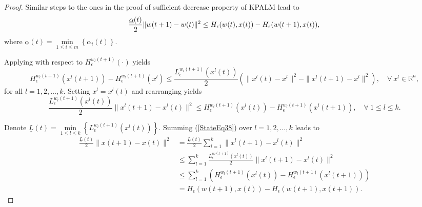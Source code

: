 \documentclass[11pt]{article}
\numberwithin{equation}{section}
\begin{document}
\begin{proof}
Similar steps to the ones in the proof of sufficient decrease property of KPALM lead to
\begin{equation}
	\frac{\underline{\alpha}(t)}{2} \|w(t+1) - w(t)\|^2 \leq H_{\epsilon}(w(t),x(t)) - H_{\epsilon}(w(t+1),x(t)) , \\ \label{StateEq37}
\end{equation}
where $\underline{\alpha}(t) = \min\limits_{1 \leq i \leq m} \left\lbrace \alpha_i(t) \right\rbrace$.

Applying  with respect to $H_{\epsilon}^{w_l(t+1)}(\cdot)$ yields
\begin{equation*}
	H_{\epsilon}^{w_l(t+1)}(x^l(t+1)) - H_{\epsilon}^{w_l(t+1)}(x^l) 
	\leq \frac{L_{\epsilon}^{w_l(t+1)}(x^l(t))}{2} \left( \|x^l(t) - x^l\|^2 - \|x^l(t+1) - x^l\|^2 \right), \quad \forall \: x^l \in \mathbb{R}^n,
\end{equation*}
for all $l=1,2, \ldots, k$.
Setting $x^l = x^l(t)$ and rearranging yields
\begin{equation}
	\frac{L_{\epsilon}^{w_l(t+1)}(x^l(t))}{2} \|x^l(t+1) - x^l(t)\|^2 \leq H_{\epsilon}^{w_l(t+1)}(x^l(t)) - H_{\epsilon}^{w_l(t+1)}(x^l(t+1)), \quad \forall \: 1 \leq l \leq k . \label{StateEq38}
\end{equation}

Denote ${\underline{L}(t)}= \min\limits_{1 \leq l \leq k} \left\lbrace L_{\epsilon}^{w_l(t+1)}(x^l(t)) \right\rbrace$. Summing (\ref{StateEq38}) over $l = 1,2, \ldots ,k$ leads to
\begin{equation}
	\begin{split}
	\frac{\underline{L}(t)}{2} \|x(t+1) - x(t)\|^2 &= 
	\frac{\underline{L}(t)}{2} \sum\limits_{l=1}^{k} \|x^l(t+1) - x^l(t)\|^2 \\
	& \leq \sum\limits_{l=1}^{k} \frac{L_{\epsilon}^{w_l(t+1)}(x^l(t))}{2} \|x^l(t+1) - x^l(t)\|^2 \\
	& \leq \sum\limits_{l=1}^{k} \left( H_{\epsilon}^{w_l(t+1)}(x^l(t)) - H_{\epsilon}^{w_l(t+1)}(x^l(t+1)) \right) \\
	& = H_{\epsilon}(w(t+1),x(t)) - H_{\epsilon}(w(t+1),x(t+1)) .
	\end{split} \label{StateEq39}
\end{equation}


\end{proof}
\end{document}
